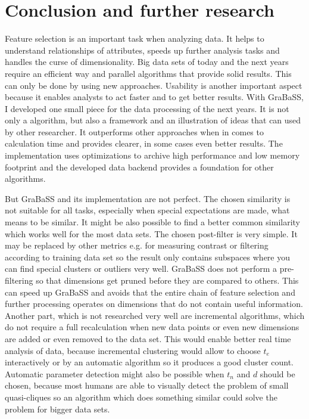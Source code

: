\chapter{Conclusion and further research}
Feature selection is an important task when analyzing data. It helps to understand relationships of attributes, speeds up further analysis tasks and handles the curse of dimensionality. Big data sets of today and the next years require an efficient way and parallel algorithms that provide solid results. This can only be done by using new approaches. Usability is another important aspect because it enables analysts to act faster and to get better results. With GraBaSS, I developed one small piece for the data processing of the next years. It is not only a algorithm, but also a framework and an illustration of ideas that can used by other researcher. It outperforms other approaches when in comes to calculation time and provides clearer, in some cases even better results. The implementation uses optimizations to archive high performance and low memory footprint and the developed data backend provides a foundation for other algorithms.

But GraBaSS and its implementation are not perfect. The chosen similarity is not suitable for all tasks, especially when special expectations are made, what means to be similar. It might be also possible to find a better common similarity which works well for the most data sets. The chosen post-filter is very simple. It may be replaced by other metrics e.g. for measuring contrast or filtering according to training data set so the result only contains subspaces where you can find special clusters or outliers very well. GraBaSS does not perform a pre-filtering so that dimensions get pruned before they are compared to others. This can speed up GraBaSS and avoids that the entire chain of feature selection and further processing operates on dimensions that do not contain useful information. Another part, which is not researched very well are incremental algorithms, which do not require a full recalculation when new data points or even new dimensions are added or even removed to the data set. This would enable better real time analysis of data, because incremental clustering would allow to choose $t_e$ interactively or by an automatic algorithm so it produces a good cluster count. Automatic parameter detection might also be possible when $t_n$ and $d$ should be chosen, because most humans are able to visually detect the problem of small quasi-cliques so an algorithm which does something similar could solve the problem for bigger data sets.

